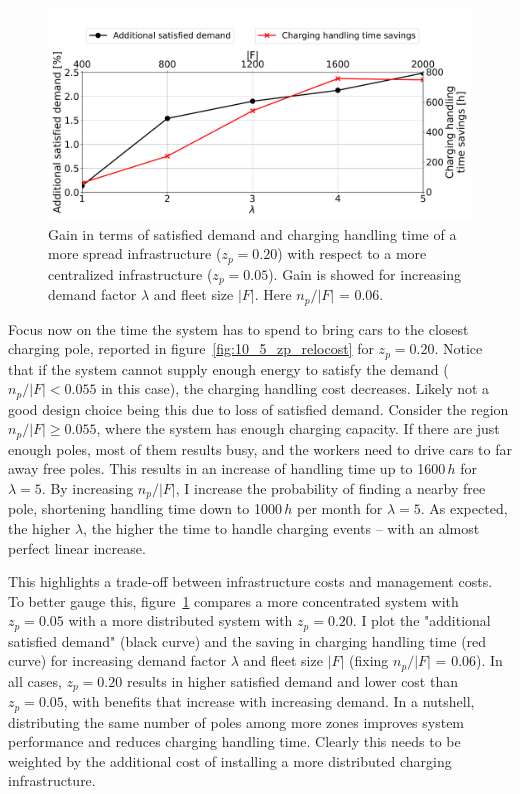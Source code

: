 \begin{figure}
\centering
\includegraphics[width=1.\linewidth]{fig/final/zp_gain.pdf}
\caption{Gain in terms of satisfied demand and charging handling time of a more spread infrastructure ($z_p = 0.20$) with respect to a more centralized infrastructure ($z_p = 0.05$). Gain is showed for increasing demand factor $\lambda$ and fleet size $|F|$. Here $n_p/|F|$ = 0.06.}
\label{fig:10_5_zp_gain}
\end{figure}

Focus now on the time the system has to spend to bring cars to the closest charging pole, reported in figure~\ref{fig:10_5_zp_relocost} for $z_p=0.20$. 
Notice that if the system cannot supply enough energy to satisfy the demand ($n_p/|F|<0.055$ in this case), the charging handling cost decreases. Likely not a good design choice being this due to loss of satisfied demand.
Consider the region $n_p/|F|\geq 0.055$, where the system has enough charging capacity. If there are just enough poles, most of them results busy, and the workers need to drive cars to far away free poles. This results in an increase of handling time up to 1600\,$h$ for $\lambda=5$. By increasing $n_p/|F|$, I increase the probability of finding a nearby free pole, shortening handling time down to 1000\,$h$ per  month for $\lambda=5$.
As expected, the higher $\lambda$, the higher the time to handle charging events -- with an almost perfect linear increase.

This highlights a trade-off between infrastructure costs and management costs. To better gauge this, figure~\ref{fig:10_5_zp_gain} compares a more concentrated system with $z_p=0.05$ with a more distributed system with $z_p=0.20$. I plot the "additional satisfied demand" (black curve) and the saving in charging handling time (red curve) for increasing demand factor $\lambda$ and fleet size $|F|$ (fixing $n_p/|F|$ = 0.06). In all cases, $z_p=0.20$ results in higher satisfied demand and lower cost than $z_p=0.05$, with benefits that increase with increasing demand. In a nutshell, distributing the same number of poles among more zones improves system performance and reduces charging handling time. Clearly this needs to be weighted by the additional cost of installing a more distributed charging infrastructure.


